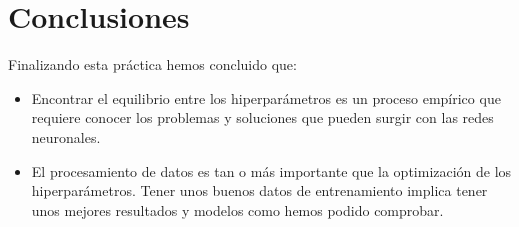 \documentclass{article}
\begin{document}
\section{Conclusiones}
Finalizando esta pr\'actica hemos concluido que:
\begin{itemize}
	\item Encontrar el equilibrio entre los hiperpar\'ametros es un proceso emp\'irico que requiere conocer los problemas y soluciones que pueden surgir con las redes neuronales.
	\item El procesamiento de datos es tan o m\'as importante que la optimizaci\'on de los hiperpar\'ametros. Tener unos buenos datos de entrenamiento implica tener unos mejores resultados y modelos como hemos podido comprobar.
\end{itemize}
\end{document}
